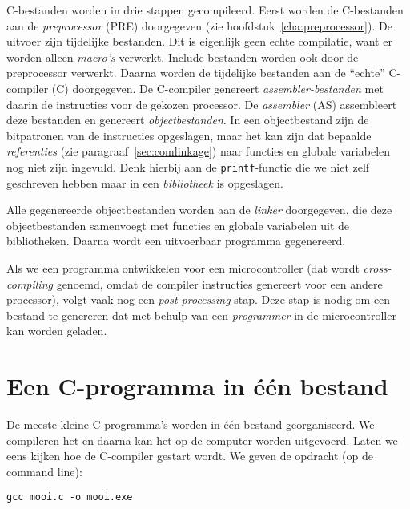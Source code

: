 C-bestanden worden in drie stappen gecompileerd. Eerst worden de C-bestanden aan de \textsl{preprocessor} (PRE) doorgegeven (zie hoofdstuk~\ref{cha:preprocessor}). De uitvoer zijn tijdelijke bestanden. Dit is eigenlijk geen echte compilatie, want er worden alleen \textsl{macro's} verwerkt. Include-bestanden worden ook door de preprocessor verwerkt. Daarna worden de tijdelijke bestanden aan de ``echte'' C-compiler (C) doorgegeven. De C-compiler genereert \textsl{assembler-bestanden} met daarin de instructies voor de gekozen processor. De \textsl{assembler} (AS) assembleert deze bestanden en genereert \textsl{objectbestanden}. In een objectbestand zijn de bitpatronen van de instructies opgeslagen, maar het kan zijn dat bepaalde \textsl{referenties} (zie paragraaf~\ref{sec:comlinkage}) naar functies en globale variabelen nog niet zijn ingevuld. Denk hierbij aan de \texttt{printf}-functie die we niet zelf geschreven hebben maar in een \textsl{bibliotheek} is opgeslagen. %

Alle gegenereerde objectbestanden worden aan de \textsl{linker} doorgegeven, die deze objectbestanden samenvoegt met functies en globale variabelen uit de bibliotheken. Daarna wordt een uitvoerbaar programma gegenereerd.

Als we een programma ontwikkelen voor een microcontroller (dat wordt \textsl{cross-compiling} genoemd, omdat de compiler instructies genereert voor een andere processor), volgt vaak nog een \textsl{post-processing}-stap. Deze stap is nodig om een bestand te genereren dat met behulp van een \textsl{programmer} in de microcontroller kan worden geladen.


\section{Een C-programma in één bestand}
De meeste kleine C-programma's worden in één bestand georganiseerd. We compileren het en daarna kan het op de computer worden uitgevoerd. Laten we eens kijken hoe de C-compiler gestart wordt. We geven de opdracht (op de command line):

\begin{lstlisting}[style=lstoneline]
gcc mooi.c -o mooi.exe
\end{lstlisting}

